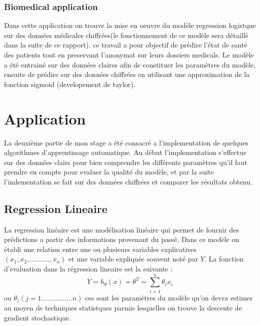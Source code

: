 \documentclass[a4paper,12pt]{article}
\begin{document}
\subsubsection{Biomedical application \cite{dowlin2017manual} } 
Dans cette application on trouve la mise en oeuvre du modèle  regression logistque sur des données médicales  chiffrées(le fonctionnement de ce modèle sera détaillé dans la suite de ce rapport). ce travail a pour objectif de prédire l'état de santé des patients tout en preservant l'anonymat sur leurs dossiers medicals.\newline
Le modèle a été entrainé sur des données claires afin de constituer les paramètres du modèle, ensuite de prédire sur des données chiffrées en utilisant une approximation de la fonction sigmoid (developement de taylor). 

\newpage
\newpage
\section{Application}
La deuxième partie de mon stage a été consacré a l'implementation de quelques algorithmes d'apprentissage automatique.\newline
Au début l'implementation s'effectue sur des données clairs pour bien comprendre les différents paramètres qu'il faut prendre en compte pour evaluer la qualité du modèle, et par la suite l'imlementation se fait sur des données chiffrées et comparer les résultats obtenu. \newline      
\subsection {Regression Lineaire}
La regression linéaire est une modélisation linéaire qui permet de fournir des prédictions a partir des informations provenant du passé, 
Dans ce modèle on établi une relation entre une ou plusieurs variables explicatives $(x_1,x_2,..........,x_n)$ et une variable expliquée souvent noté par $Y$.\newline
La fonction d'evaluation dans la régression lineaire est la suivante : \newline
$$Y =h_{\theta}(x) = \theta^T = \sum_{i=1}^{n} \theta_ix_i $$\newline
ou $\theta_j (j=1................n)$ ces sont les paramètres du modèle qu'on devra estimer au moyen de techniques statistques parmis  lesquelles on trouve la descente de gradient stochastique.\newline
\end{document}
